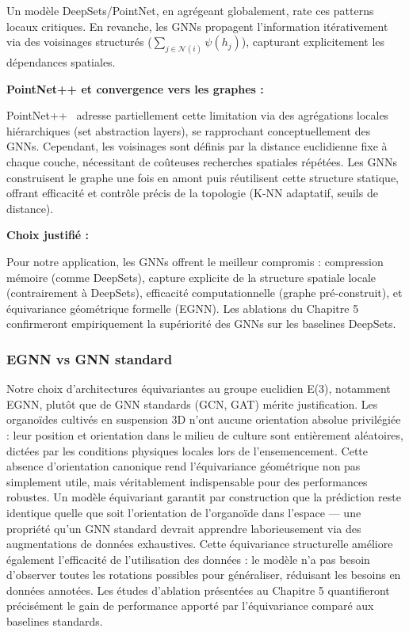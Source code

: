 Un modèle DeepSets/PointNet, en agrégeant globalement, rate ces patterns locaux critiques. En revanche, les GNNs propagent l'information itérativement via des voisinages structurés ($\sum_{j \in \mathcal{N}(i)} \psi(h_j)$), capturant explicitement les dépendances spatiales.

\textbf{PointNet++ et convergence vers les graphes :}

PointNet++~\cite{Qi2017b} adresse partiellement cette limitation via des agrégations locales hiérarchiques (set abstraction layers), se rapprochant conceptuellement des GNNs. Cependant, les voisinages sont définis par la distance euclidienne fixe à chaque couche, nécessitant de coûteuses recherches spatiales répétées. Les GNNs construisent le graphe une fois en amont puis réutilisent cette structure statique, offrant efficacité et contrôle précis de la topologie (K-NN adaptatif, seuils de distance).

\textbf{Choix justifié :}

Pour notre application, les GNNs offrent le meilleur compromis : compression mémoire (comme DeepSets), capture explicite de la structure spatiale locale (contrairement à DeepSets), efficacité computationnelle (graphe pré-construit), et équivariance géométrique formelle (EGNN). Les ablations du Chapitre 5 confirmeront empiriquement la supériorité des GNNs sur les baselines DeepSets.

\subsubsection{EGNN vs GNN standard}

Notre choix d'architectures équivariantes au groupe euclidien E(3), notamment EGNN, plutôt que de GNN standards (GCN, GAT) mérite justification. Les organoïdes cultivés en suspension 3D n'ont aucune orientation absolue privilégiée : leur position et orientation dans le milieu de culture sont entièrement aléatoires, dictées par les conditions physiques locales lors de l'ensemencement. Cette absence d'orientation canonique rend l'équivariance géométrique non pas simplement utile, mais véritablement indispensable pour des performances robustes. Un modèle équivariant garantit par construction que la prédiction reste identique quelle que soit l'orientation de l'organoïde dans l'espace — une propriété qu'un GNN standard devrait apprendre laborieusement via des augmentations de données exhaustives. Cette équivariance structurelle améliore également l'efficacité de l'utilisation des données : le modèle n'a pas besoin d'observer toutes les rotations possibles pour généraliser, réduisant les besoins en données annotées. Les études d'ablation présentées au Chapitre 5 quantifieront précisément le gain de performance apporté par l'équivariance comparé aux baselines standards.


